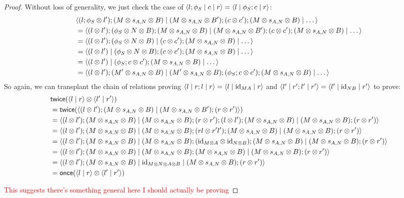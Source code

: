 \documentclass[11pt,letterpaper]{article}
\theoremstyle{plain}
\theoremstyle{definition}
\newcommand{\id}{\mathrm{id}}
\newcommand{\rep}[2]{{\ensuremath \left\langle #1 \mid #2 \right\rangle}}
\newcommand{\repthree}[3]{{\ensuremath \langle #1 \mid #2 \mid #3 \rangle}}
\newcommand{\once}{\mathsf{once}}
\newcommand{\twice}{\mathsf{twice}}
\newcommand{\todo}[1]{\textcolor{red}{\small #1}}
\begin{document}
\begin{proof}
Without loss of generality, we just check the case of $\repthree{l;\phi_S}{c}{r} = \repthree{l}{\phi_S ; c}{r}$:
\begin{align*}
&\repthree{(l;\phi_S \otimes l');(M \otimes s_{A,N} \otimes B)}{(M \otimes s_{A,N} \otimes B');(c \otimes c');(M \otimes s_{A,N} \otimes B)}{\dots} \\
&= \repthree{(l \otimes l');(\phi_S \otimes N \otimes B);(M \otimes s_{A,N} \otimes B)}{(M \otimes s_{A,N} \otimes B');(c \otimes c');(M \otimes s_{A,N} \otimes B)}{\dots} \\
&= \repthree{(l \otimes l');(\phi_S \otimes N \otimes B)}{(c \otimes c');(M \otimes s_{A,N} \otimes B)}{\dots} \\
&= \repthree{(l \otimes l')}{(\phi_S \otimes N \otimes B);(c \otimes c');(M \otimes s_{A,N} \otimes B)}{\dots} \\
&= \repthree{(l \otimes l')}{(\phi_S;c \otimes c');(M \otimes s_{A,N} \otimes B)}{\dots} \\
&= \repthree{(l \otimes l');(M' \otimes s_{A,N} \otimes B)}{(M' \otimes s_{A,N} \otimes B);(\phi_S;c \otimes c');(M \otimes s_{A,N} \otimes B)}{\dots}
\end{align*}
So again, we can transplant the chain of relations proving $\repthree{l}{r;l}{r} = \repthree{l}{\id_{MA}}{r}$ and $\repthree{l'}{r';l'}{r'} = \repthree{l'}{\id_{NB}}{r'}$ to prove:
\begin{align*}
&\twice(\rep{l}{r} \otimes \rep{l'}{r'}) \\
&= \twice(\rep{(l \otimes l');(M \otimes s_{A,N} \otimes B)}{(M \otimes s_{A,N} \otimes B');(r \otimes r')}) \\
&=\repthree{(l \otimes l');(M \otimes s_{A,N} \otimes B)}{(M \otimes s_{A,N} \otimes B);(r \otimes r');(l \otimes l');(M \otimes s_{A,N} \otimes B)}{(M \otimes s_{A,N} \otimes B);(r \otimes r')} \\
&= \repthree{(l \otimes l');(M \otimes s_{A,N} \otimes B)}{(M \otimes s_{A,N} \otimes B);(rl \otimes r'l');(M \otimes s_{A,N} \otimes B)}{(M \otimes s_{A,N} \otimes B);(r \otimes r')} \\
&= \repthree{(l \otimes l');(M \otimes s_{A,N} \otimes B)}{(M \otimes s_{A,N} \otimes B);(\id_{M \otimes A} \otimes \id_{N \otimes B});(M \otimes s_{A,N} \otimes B)}{(M \otimes s_{A,N} \otimes B);(r \otimes r')} \\
&= \repthree{(l \otimes l');(M \otimes s_{A,N} \otimes B)}{(M \otimes s_{A,N} \otimes B);(M \otimes s_{A,N} \otimes B)}{(M \otimes s_{A,N} \otimes B);(r \otimes r')} \\
&= \repthree{(l \otimes l');(M \otimes s_{A,N} \otimes B)}{\id_{M \otimes N \otimes A \otimes B}}{(M \otimes s_{A,N} \otimes B);(r \otimes r')} \\
&= \once(\rep{l}{r} \otimes \rep{l'}{r'})
\end{align*}

\todo{This suggests there's something general here I should actually be proving}
\end{proof}
\end{document}
